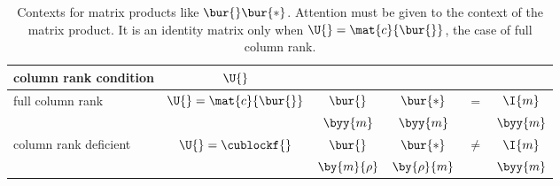 \begin{table}[htdp]
\caption[Contexts for matrix products like $\bur{}\bur{*}$]{Contexts for matrix products like $\bur{}\bur{*}$. Attention must be given to the context of the matrix product. It is an identity matrix only when $\U{}=\mat{c}{\bur{}}$, the case of full column rank.}
\begin{center}
\begin{tabular}{lccccc}
%
column rank condition & $\U{}$ &&&& \\\hline
%
full column rank      & $\U{}=\mat{c}{\bur{}}$ & $\bur{}$ & $\bur{*}$ & $=$   & $\I{m}$ \\
%
 && $\byy{m}$ & $\byy{m}$ && $\byy{m}$\\[10pt]
column rank deficient & $\U{}=\cublockf{}$ & $\bur{}$ & $\bur{*}$ & $\ne$ & $\I{m}$ \\
%
 && $\by{m}{\rho}$ & $\by{\rho}{m}$ && $\byy{m}$
%
\end{tabular}
\end{center}
\label{tab:penrose:unitary}
\end{table}%